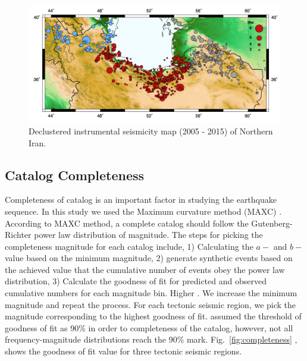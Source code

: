 \begin{figure} [ht]
\centering
\includegraphics[scale=0.6]{figures/pdf/Figure02.pdf} 
\caption{Declustered instrumental seismicity map (2005 - 2015) of Northern Iran.}
\label{fig:seismicity}
\end{figure}


\subsection{Catalog Completeness}
\noindent
Completeness of catalog is an important factor in studying the earthquake sequence.  In this study we used the Maximum curvature method (MAXC) \citep{Wiemer2000}. According to MAXC method, a complete catalog should follow the Gutenberg-Richter power law distribution of magnitude. The steps for picking the completeness magnitude for each catalog include, 1) Calculating the $a-$ and $b-$ value based on the minimum magnitude, 2) generate  synthetic events based on the achieved value that the cumulative number of events obey the power law distribution, 3) Calculate the goodness of fit for predicted and observed cumulative numbers for each magnitude bin. Higher \citep{Wiemer2000}. We increase the minimum magnitude and repeat the process. For each tectonic seismic region, we pick the magnitude corresponding to the highest goodness of fit.  \citet{Wiemer2000} assumed the threshold of goodness of fit as 90\% in order to completeness of the catalog, however,  not all frequency-magnitude distributions reach the 90\% mark. Fig.~\ref{fig:completeness} , shows the goodness of fit value for three tectonic seismic regions. 


